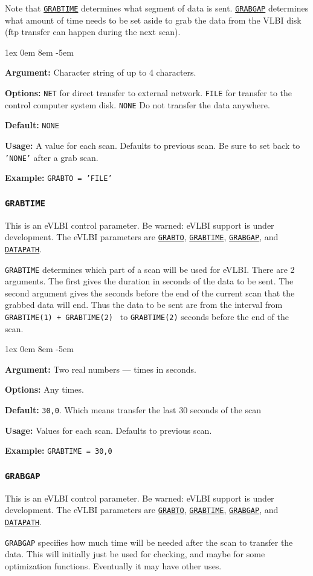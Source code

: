 \documentclass{report}
\newcommand{\rcwbox}[5]{
  \begin{list}{}{\parsep 1ex  \itemsep 0em
                 \leftmargin 8em  \itemindent -5em }
    \item {\bf Argument:} #1
    \item {\bf Options:}  #2
    \item {\bf Default:}  #3
    \item {\bf Usage:}    #4
    \item {\bf Example:}  #5
  \end{list}
}
\begin{document}
Note that 
{\hyperref[MP:GRABTIME]{{\tt GRABTIME}}} determines what
segment of data is sent.  
{\hyperref[MP:GRABGAP]{{\tt GRABGAP}}} determines
what amount of time needs to be set aside to grab the data from the
VLBI disk (ftp transfer can happen during the next scan).

\rcwbox
{ Character string of up to 4 characters.}
{{\tt NET} for direct transfer to external network.
 {\tt FILE} for transfer to the control computer system disk.
 {\tt NONE} Do not transfer the data anywhere.}
{{\tt NONE}}
{A value for each scan.  Defaults to previous scan.  Be sure to set
back to {\tt 'NONE'} after a grab scan.}
{{\tt GRABTO = 'FILE' }}

\subsubsection{\label{MP:GRABTIME}{\tt GRABTIME}}

This is an eVLBI control parameter.  Be warned: eVLBI support is
under development.
The eVLBI parameters are 
{\hyperref[MP:GRABTO]{{\tt GRABTO}}},
{\hyperref[MP:GRABTIME]{{\tt GRABTIME}}}, 
{\hyperref[MP:GRABGAP]{{\tt GRABGAP}}},
and 
{\hyperref[MP:DATAPATH]{{\tt DATAPATH}}}.

{\tt GRABTIME} determines which part of a scan will be used for
eVLBI.  There are 2 arguments.  The first gives the duration in
seconds of the data to be sent.  The second argument gives the
seconds before the end of the current scan that the grabbed data
will end.  Thus the data to be sent are from the interval from
{\tt GRABTIME(1) + GRABTIME(2) } to {\tt GRABTIME(2)} seconds
before the end of the scan.


\rcwbox
{ Two real numbers --- times in seconds.}
{ Any times.}
{{\tt 30,0}.  Which means transfer the last 30 seconds of the scan}
{Values for each scan.  Defaults to previous scan.}
{{\tt GRABTIME = 30,0 }}


\subsubsection{\label{MP:GRABGAP}{\tt GRABGAP}}

This is an eVLBI control parameter.  Be warned: eVLBI support is
under development.
The eVLBI parameters are 
{\hyperref[MP:GRABTO]{{\tt GRABTO}}},
{\hyperref[MP:GRABTIME]{{\tt GRABTIME}}}, 
{\hyperref[MP:GRABGAP]{{\tt GRABGAP}}},
and 
{\hyperref[MP:DATAPATH]{{\tt DATAPATH}}}.

{\tt GRABGAP} specifies how much time will be needed after the
scan to transfer the data.  This will initially just be used for
checking, and maybe for some optimization functions.  Eventually
it may have other uses.
\end{document}
